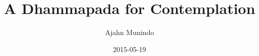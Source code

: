 \documentclass[
  final,
  pagePreset=tallpage,
  babelLanguage=british,
]{anecdote}
\title{A Dhammapada for Contemplation}
\subtitle{}
\author{Ajahn Munindo}
\date{2015-05-19}
\begin{document}
\frontmatter

%

%

\cleartorecto
\tableofcontents*



\mainmatter

\cleartorecto
\part{\thetitle}




\backmatter


\end{document}
